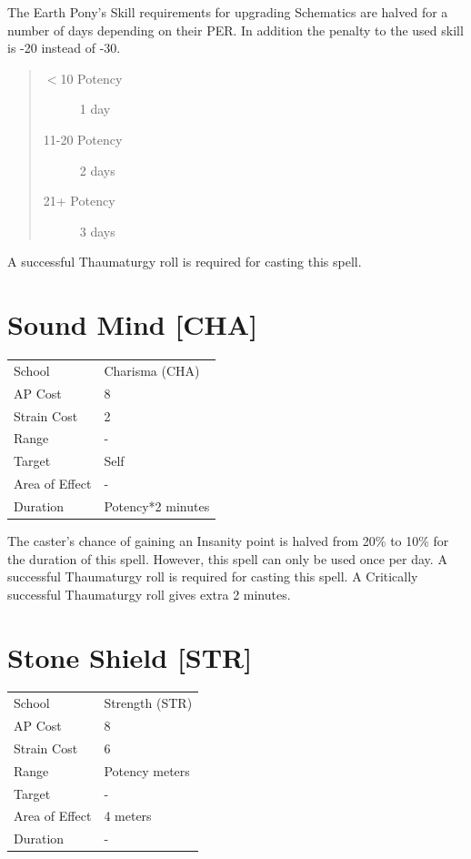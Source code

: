 \documentclass[11pt,a4paper,twocolumn]{book}
\begin{document}
\medskip

The Earth Pony's Skill requirements for upgrading Schematics are halved for a number of days depending on their PER. In addition the penalty to the used skill is -20 instead of -30.

\begin{quote}
  \begin{description}
    \item[$<$10 Potency] 	1 day
    \item[11-20 Potency] 	2 days
    \item[21+ Potency] 	3 days
  \end{description}	
\end{quote}

A successful Thaumaturgy roll is required for casting this spell.

\vfill

\section*{Sound Mind [CHA]}
{
	\begin{tabu} to 75mm{| X[l,4] | X[l,7] |}
		\hline
		School 			& Charisma (CHA) 	\\
        AP Cost	      	& 8 				\\
        Strain Cost     & 2 				\\
        Range     		& - 				\\
        Target      	& Self 				\\
        Area of Effect  & - 	 			\\
        Duration     	& Potency*2 minutes \\ \hline
	\end{tabu}
		
}

\medskip

The caster's chance of gaining an Insanity point is halved from 20\% to 10\% for the duration of this spell. However, this spell can only be used once per day. A successful Thaumaturgy roll is required for casting this spell. A Critically successful Thaumaturgy roll gives extra 2 minutes.


\section*{Stone Shield [STR]}
{
	\begin{tabu} to 75mm{| X[l,4] | X[l,7] |}
		\hline
		School 			& Strength (STR) 	\\
        AP Cost	      	& 8 				\\
        Strain Cost     & 6 				\\
        Range     		& Potency meters 	\\
        Target      	& - 				\\
        Area of Effect  & 4 meters 	 		\\
        Duration     	& - 				\\ \hline
	\end{tabu}
		
}
\end{document}
